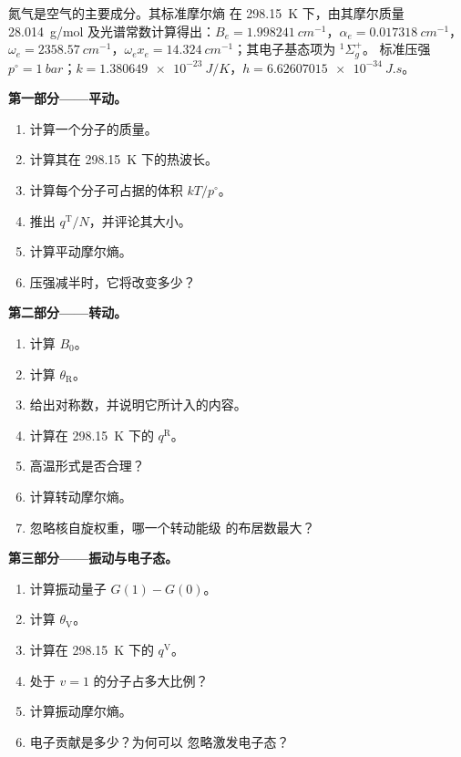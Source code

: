 \begin{problem}
\label{pb:b3:partition-functions:1}
氮气是空气的主要成分。其标准摩尔熵
在 \qty{298.15}{K} 下，由其摩尔质量 \qty{28.014}{g/mol}
及光谱常数计算得出：$B_e = \qty{1.998241}{cm^{-1}}$，$\alpha_e = \qty{0.017318}{cm^{-1}}$，$\omega_e =
\qty{2358.57}{cm^{-1}}$，$\omega_ex_e = \qty{14.324}{cm^{-1}}$；其电子基态项为 ${}^1\Sigma_g^+$。
标准压强 $p^\circ = \qty{1}{bar}$；$k = \qty{1.380649e-23}{J/K}$，$h = \qty{6.62607015e-34}{J.s}$。

\medskip\noindent\textbf{第一部分——平动。}
\begin{enumerate}
  \item 计算一个分子的质量。
  \item 计算其在 \qty{298.15}{K} 下的热波长。
  \item 计算每个分子可占据的体积 $kT/p^\circ$。
  \item 推出 $q^{\mathrm T}/N$，并评论其大小。
  \item 计算平动摩尔熵。
  \item 压强减半时，它将改变多少？
\end{enumerate}

\medskip\noindent\textbf{第二部分——转动。}
\begin{enumerate}[resume]
  \item 计算 $B_0$。
  \item 计算 $\theta_{\mathrm R}$。
  \item 给出对称数，并说明它所计入的内容。
  \item 计算在 \qty{298.15}{K} 下的 $q^{\mathrm R}$。
  \item 高温形式是否合理？
  \item 计算转动摩尔熵。
  \item 忽略核自旋权重，哪一个转动能级
        的布居数最大？
\end{enumerate}

\medskip\noindent\textbf{第三部分——振动与电子态。}
\begin{enumerate}[resume]
  \item 计算振动量子 $G(1) - G(0)$。
  \item 计算 $\theta_{\mathrm V}$。
  \item 计算在 \qty{298.15}{K} 下的 $q^{\mathrm V}$。
  \item 处于 $v = 1$ 的分子占多大比例？
  \item 计算振动摩尔熵。
  \item 电子贡献是多少？为何可以
        忽略激发电子态？
\end{enumerate}


\end{problem}
